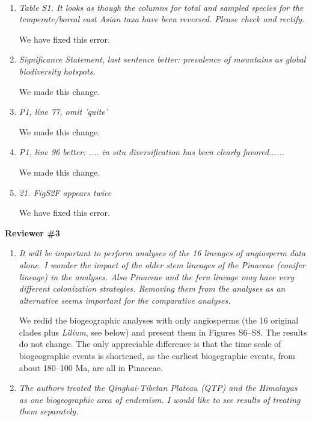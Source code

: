 \documentclass[11pt]{letter}
\begin{document}
\begin{letter}{ \\

}
\begin{enumerate}
\item \textit{Table S1. It looks as though the columns for total and
    sampled species for the temperate/boreal east Asian taxa have been
    reversed. Please check and rectify.}

  We have fixed this error.

\item \textit{Significance Statement, last sentence better: prevalence
    of mountains as global biodiversity hotspots.}

  We made this change.

\item \textit{P1, line 77, omit 'quite'}

  We made this change.

\item \textit{P1, line 96 better: .... in situ diversification has
    been clearly favored......}

  We made this change.

\item \textit{21. FigS2F appears twice}

  We have fixed this error.

\end{enumerate}


\textbf{Reviewer \#3}

\begin{enumerate}

\item \textit{It will be important to perform analyses of the 16
    lineages of angiosperm data alone. I wonder the impact of the
    older stem lineages of the Pinaceae (conifer lineage) in the
    analyses. Also Pinaceae and the fern lineage may have very
    different colonization strategies. Removing them from the analyses
    as an alternative seems important for the comparative analyses.}

  We redid the biogeographic analyses with only angiosperms (the 16
  original clades plus \textit{Lilium}, see below) and present them in
  Figures S6--S8. The results do not change. The only appreciable
  difference is that the time scale of biogeographic events is
  shortened, as the earliest biogegraphic events, from about 180--100
  Ma, are all in Pinaceae.

\item \textit{The authors treated the Qinghai-Tibetan Plateau (QTP)
    and the Himalayas as one biogeographic area of endemism. I would
    like to see results of treating them separately.}


\end{enumerate}
\end{letter}
\end{document}
